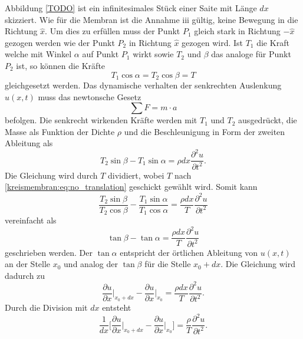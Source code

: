 Abbildung \ref{TODO} ist ein infinitesimales Stück einer Saite mit Länge $ dx $ skizziert.
Wie für die Membran ist die Annahme iii gültig, keine Bewegung in die Richtung $ \hat{x} $.
Um dies zu erfüllen muss der Punkt $ P_1 $ gleich stark in Richtung $ -\hat{x} $ gezogen werden wie der Punkt $ P_2 $ in Richtung $ \hat{x} $ gezogen wird. Ist $ T_1 $ die Kraft welche mit Winkel $ \alpha $ auf Punkt $ P_1 $ wirkt sowie $ T_2 $ und $ \beta$ das analoge für Punkt $ P_2 $ ist, so können die Kräfte 
\begin{equation}\label{kreismembran:eq:no_translation}
	T_1 \cos \alpha = T_2 \cos \beta = T
\end{equation}
gleichgesetzt werden. 
Das dynamische verhalten der senkrechten Auslenkung $ u(x,t) $ muss das newtonsche Gesetz 
\begin{equation*}
	\sum F = m \cdot a
\end{equation*} 
befolgen. Die senkrecht wirkenden Kräfte werden mit $ T_1 $ und $ T_2 $ ausgedrückt, die Masse als Funktion der Dichte $ \rho $ und die Beschleunigung in Form der zweiten Ableitung als
\begin{equation*}
	T_2 \sin \beta - T_1 \sin \alpha = \rho dx \frac{\partial^2 u}{\partial t^2} .
\end{equation*}
Die Gleichung wird durch $ T $ dividiert, wobei $ T $ nach \ref{kreismembran:eq:no_translation} geschickt gewählt wird. Somit kann
\begin{equation*}
	\frac{T_2 \sin \beta}{T_2 \cos \beta} - \frac{T_1 \sin \alpha}{T_1 \cos \alpha} = \frac{\rho dx}{T} \frac{\partial^2 u}{\partial t^2}
\end{equation*}
vereinfacht als  
\begin{equation*}
	\tan \beta - \tan \alpha = \frac{\rho dx}{T} \frac{\partial^2 u}{\partial t^2}
\end{equation*}
geschrieben werden. 
Der $ \tan \alpha $ entspricht der örtlichen Ableitung von $ u(x,t) $ an der Stelle $ x_0 $ und analog der $ \tan \beta $ für die Stelle $ x_0 + dx $.
Die Gleichung wird dadurch zu
\begin{equation*}
	\frac{\partial u}{\partial x} \big\vert_{x_0 + dx} - \frac{\partial u}{\partial x} \big\vert_{x_0} = \frac{\rho dx}{T} \frac{\partial^2 u}{\partial t^2}.
\end{equation*} 
Durch die Division mit $ dx $ entsteht 
\begin{equation*}
	\frac{1}{dx} \bigg[\frac{\partial u}{\partial x} \big\vert_{x_0 + dx} - \frac{\partial u}{\partial x} \big\vert_{x_0}\bigg] = \frac{\rho}{T}\frac{\partial^2 u}{\partial t^2}.
\end{equation*}
